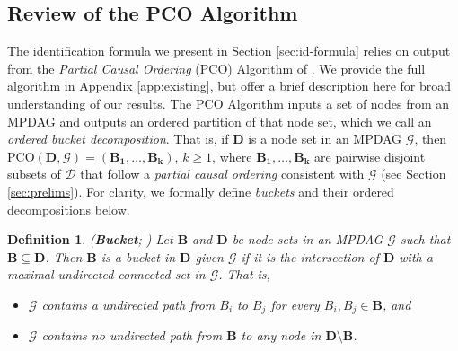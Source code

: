\documentclass[11pt]{article}
\newtheorem{definition}[theorem]{Definition}
\newcommand{\mb}[1]{\mathbf{#1}}
\newcommand{\g}[1][G]{\mathcal{#1}}
\begin{document}

\subsection{Review of the PCO Algorithm}
\label{sec:id-pco}

The identification formula we present in Section \ref{sec:id-formula} relies on output from the \textit{Partial Causal Ordering} (PCO) Algorithm of \cite{perkovic2020identifying}. We provide the full algorithm in Appendix \ref{app:existing}, but offer a brief description here for broad understanding of our results. The PCO Algorithm inputs a set of nodes from an MPDAG and outputs an ordered partition of that node set, which we call an \textit{ordered bucket decomposition}. That is, if $\mb{D}$ is a node set in an MPDAG $\g$, then $\text{PCO}(\mb{D},\g) = (\mb{B_1}, \dots, \mb{B_k})$, $k \ge 1$, where $\mb{B_1}, \dots, \mb{B_k}$ are pairwise disjoint subsets of $\g[D]$ that follow a \textit{partial causal ordering} consistent with $\g$ (see Section \ref{sec:prelims}). For clarity, we formally define \textit{buckets} and their ordered decompositions below.

\begin{definition}
\label{def:bucket}
{\normalfont (\textbf{Bucket}; \citealp{perkovic2020identifying})}
    Let $\mb{B}$ and $\mb{D}$ be node sets in an MPDAG $\g$ such that $\mb{B} \subseteq \mb{D}$. Then $\mb{B}$ is a bucket in $\mb{D}$ given $\g$ if it is the intersection of $\mb{D}$ with a maximal undirected connected set in $\g$. That is,
    \begin{itemize}
        \item $\g$ contains a undirected path from $B_i$ to $B_j$ for every $B_i, B_j \in \mb{B}$, and  
        \item $\g$ contains no undirected path from $\mb{B}$ to any node in $\mb{D} \setminus \mb{B}$.
    \end{itemize}
\end{definition}
\end{document}
